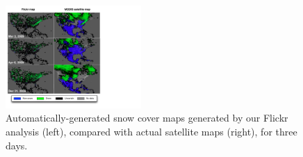 \begin{figure}[t]
\begin{center}
\includegraphics[width=0.46\textwidth,trim=0.2cm 0.7cm 6cm 0cm,clip]{figs/satellite-map.pdf}
\end{center}
\vspace{-12pt}
\caption{Automatically-generated snow cover maps generated by our
Flickr analysis (left), compared with actual satellite maps (right),
for three days.}
\label{fig:satellite}
\vspace{-8pt}
\end{figure}

 
